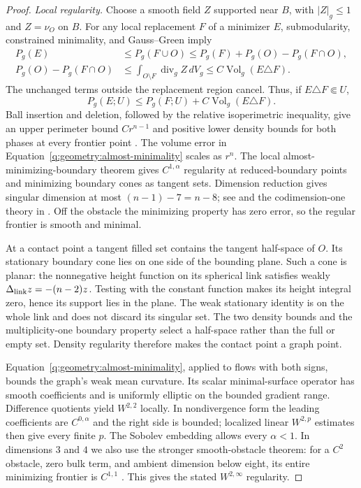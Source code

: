 \begin{proof}
\emph{Local regularity.}
Choose a smooth field $Z$ supported near $B$, with $|Z|_g\le1$ and
$Z=\nu_O$ on $B$. For any local replacement $F$ of a minimizer $E$,
submodularity, constrained minimality, and Gauss--Green imply
\begin{align*}
 P_g(E)&\le P_g(F\cup O)
       \le P_g(F)+P_g(O)-P_g(F\cap O),\\
 P_g(O)-P_g(F\cap O)&\le
       \int_{O\setminus F}\operatorname{div}_gZ\,dV_g
       \le C\operatorname{Vol}_g(E\triangle F).
\end{align*}
The unchanged terms outside the replacement region cancel. Thus, if
$E\triangle F\Subset U$,
\begin{equation}\label{q:geometry:almost-minimality}
 P_g(E;U)\le P_g(F;U)+C\operatorname{Vol}_g(E\triangle F).
\end{equation}
Ball insertion and deletion, followed by the relative isoperimetric
inequality, give an upper perimeter bound $Cr^{n-1}$ and positive
lower density bounds for both phases at every frontier point
\cite{Maggi2012}. The
volume error in Equation~\eqref{q:geometry:almost-minimality} scales
as $r^n$. The local almost-minimizing-boundary theorem gives
$C^{1,\alpha}$ regularity at reduced-boundary points and minimizing
boundary cones as tangent sets. Dimension reduction gives singular
dimension at most $(n-1)-7=n-8$; see
\cite[Theorem~2.27]{BiZhu2026} and the codimension-one theory in
\cite[Chapter~7]{Simon2018}. Off the obstacle the minimizing property
has zero error, so the regular frontier is smooth and minimal.

At a contact point a tangent filled set contains the tangent
half-space of $O$. Its stationary boundary cone lies on one side of
the bounding plane. Such a cone is planar: the nonnegative height
function on its spherical link satisfies weakly
$\Delta_{\rm link}z=-(n-2)z$. Testing with the constant function
makes its height integral zero, hence its support lies in the plane.
The weak stationary identity is on the whole link and does not
discard its singular set. The two density bounds and the
multiplicity-one boundary property select a half-space rather than
the full or empty set. Density regularity therefore makes the contact
point a graph point.

Equation~\eqref{q:geometry:almost-minimality}, applied to flows with
both signs, bounds the graph's weak mean curvature. Its scalar
minimal-surface operator has smooth coefficients and is uniformly
elliptic on the bounded gradient range. Difference quotients yield
$W^{2,2}$ locally. In nondivergence form the leading coefficients
are $C^{0,\alpha}$ and the right side is bounded; localized linear
$W^{2,p}$ estimates then give every finite $p$. The Sobolev embedding
allows every $\alpha<1$. In dimensions $3$ and $4$ we also use the
stronger smooth-obstacle theorem: for a $C^2$ obstacle, zero bulk
term, and ambient dimension below eight, its entire minimizing
frontier is $C^{1,1}$
\cite[Regularity Theorem~1.3(iii), pp.~368--369]{HuiskenIlmanen2001}.
This gives the stated $W^{2,\infty}$ regularity.


\end{proof}
